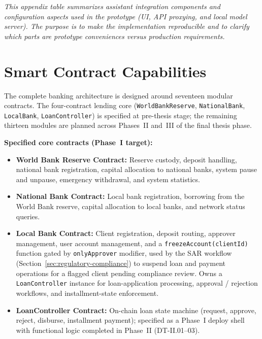 \documentclass[12pt,a4paper]{report}
\begin{document}
\vspace{2pt}
\noindent\textit{\small This appendix table summarizes assistant integration components and configuration aspects used in the prototype (UI, API proxying, and local model server). The purpose is to make the implementation reproducible and to clarify which parts are prototype conveniences versus production requirements.}

\chapter{Smart Contract Capabilities}

The complete banking architecture is designed around seventeen modular contracts. The four-contract lending core (\texttt{WorldBankReserve}, \texttt{NationalBank}, \texttt{LocalBank}, \texttt{LoanController}) is specified at pre-thesis stage; the remaining thirteen modules are planned across Phases~II and~III of the final thesis phase.

\textbf{Specified core contracts (Phase~I target):}
\begin{itemize}[noitemsep]
\item \textbf{World Bank Reserve Contract:} Reserve custody, deposit handling, national bank registration, capital allocation to national banks, system pause and unpause, emergency withdrawal, and system statistics.
\item \textbf{National Bank Contract:} Local bank registration, borrowing from the World Bank reserve, capital allocation to local banks, and network status queries.
\item \textbf{Local Bank Contract:} Client registration, deposit routing, approver management, user account management, and a \texttt{freezeAccount(clientId)} function gated by \texttt{onlyApprover} modifier, used by the SAR workflow (Section~\ref{sec:regulatory-compliance}) to suspend loan and payment operations for a flagged client pending compliance review. Owns a \texttt{LoanController} instance for loan-application processing, approval / rejection workflows, and installment-state enforcement.
\item \textbf{LoanController Contract:} On-chain loan state machine (request, approve, reject, disburse, installment payment); specified as a Phase~I deploy shell with functional logic completed in Phase~II (DT-II.01--03).
\end{itemize}
\end{document}
